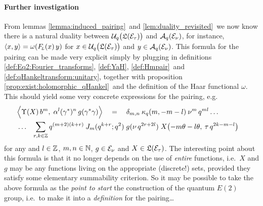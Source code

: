 \paragraph{Further investigation}
From lemmas \ref{lemma:induced_pairing}\ and \ref{lem:duality_revisited}\
we now know there is a natural duality between
$\Uq\!\left(\calL(\Hcore_\tau)\vertM\right)$ and ${\mathcal A}_q(\mathcal E_\nu)$,
for instance,
$\langle x,y \rangle = \omega(F_{\!\scriptscriptstyle L}(x)\,y)$
for
$x \in \Uq\!\left(\calL(\Hcore_\tau)\vertM\right)$ and $y \in {\mathcal A}_q(\mathcal E_\nu)$.
This formula for the pairing can be made very explicit simply
by plugging in definitions \ref{def:Eq2:Fourier_transforms},
\ref{def:YaH}, \ref{def:Hmpair}\ and \ref{def:qHankeltransform:unitary},
together with proposition \ref{prop:exist:holomorphic_qHankel}\
and the definition of the Haar functional $\omega$.
This should yield some very concrete expressions for the pairing, e.g.
\begin{eqnarray*}
  \lefteqn{  \left\langle \vertL\Upsilon(X)\, b^m, \;
     \alpha^l (\gamma^*)^n \,g(\gamma^*\gamma)  \right\rangle
     \hspace{1em}=\hspace{1em}
     \delta_{m,n} \: \kq(m,-m-l)\: \nu^m \, q^{ml} \ldots } \\
  &\ldots & \sum_{r,k\in \ZZ}   q^{(m+2)(k+r)} \: \J{m}{q^{k+r}} \;   g(\nu\, q^{2r+2l}) \;
       X\!\left(-m\theta-l\theta, \: \tau\, q^{2k-m-l} \vertM
           \right) \hspace{1em} \label{eq:Eq2:induced_pairing}
\end{eqnarray*}
for any and $l\in \mathbb{Z}$, $m,n\in \mathbb{N}$, $g \in \mathcal E_\nu$ and $X\in
\mathfrak{L}(\mathcal E_\tau)$. The interesting point about this formula is that it no
longer depends on the use of {\em entire\/} functions, i.e.\ $X$ and $g$ may be
any functions living on the appropriate (discrete!) sets, provided they satisfy
some elementary summability criterion.
So it may be possible to take the above formula as the {\em point to start\/} the construction
of the quantum $E(2)$ group, i.e.\ to make it into a {\em definition\/} for the pairing\ldots

